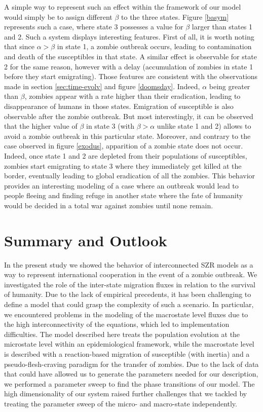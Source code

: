 \documentclass[11pt]{article} %
\begin{document}
A simple way to represent such an effect within the framework of our model would simply be to assign different $\beta$ to the three states. Figure \ref{basym} represents such a case, where state 3 possesses a value for $\beta$ larger than states 1 and 2. Such a system displays interesting features. First of all, it is worth noting that since $\alpha>\beta$ in state 1, a zombie outbreak occurs, leading to contamination and death of the susceptibles in that state. A similar effect is observable for state 2 for the same reason, however with a delay (accumulation of zombies in state 1 before they start emigrating). Those features are consistent with the observations made in section \ref{sec:time-evolv} and figure \ref{doomsday}. Indeed, $\alpha$ being greater than $\beta$, zombies appear with a rate higher than their eradication, leading to disappearance of humans in those states. Emigration of susceptible is also observable after the zombie outbreak. But most interestingly, it can be observed that the higher value of $\beta$ in state 3 (with $\beta>\alpha$ unlike state 1 and 2) allows to avoid a zombie outbreak in this particular state. Moreover, and contrary to the case observed in figure \ref{exodus}, apparition of a zombie state does not occur. Indeed, once state 1 and 2 are depleted from their populations of susceptibles, zombies start emigrating to state 3 where they immediately get killed at the border, eventually leading to global eradication of all the zombies. This behavior provides an interesting modeling of a case where an outbreak would lead to people fleeing and finding refuge in another state where the fate of humanity would be decided in a total war against zombies until none remain.





\newpage
\section{Summary and Outlook}\indent

In the present study we showed the behavior of interconnected SZR models as a way to represent international cooperation in the event of a zombie outbreak. We investigated the role of the inter-state migration fluxes in relation to the survival of humanity. Due to the lack of empirical precedents, it has been challenging to define a model that could grasp the complexity of such a scenario. In particular, we encountered problems in the modeling of the macrostate level fluxes due to the high interconnectivity of the equations, which led to implementation difficulties. The model described here treats the population evolution at the microstate level within an epidemiological framework, while the macrostate level is described with a reaction-based migration of susceptible (with inertia) and a pseudo-flesh-craving paradigm for the transfer of zombies. Due to the lack of data that could have allowed us to generate the parameters needed for our description, we performed a parameter sweep to find the phase transitions of our model. The high dimensionality of our system raised further challenges that we tackled by treating the parameter sweep of the micro- and macro-state independently. 
\end{document}
